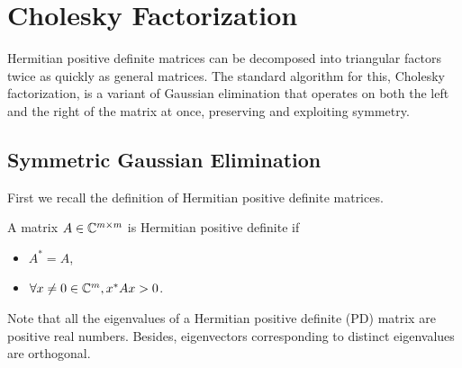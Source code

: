 \chapter{Cholesky Factorization}
Hermitian positive definite matrices can be decomposed into triangular factors twice as quickly as general matrices. The standard algorithm for this, Cholesky factorization, is a variant of Gaussian elimination that operates on both the left and the right of the matrix at once, preserving and exploiting symmetry.

\section{Symmetric Gaussian Elimination}

First we recall the definition of Hermitian positive definite matrices. 

\begin{definition}
\label{def: Hermitian positive definite matrix}
A matrix $A\in \mathbb{C}^{m\times m}$ is Hermitian positive definite if 
\begin{itemize}
    \item $A^*= A$,
    \item $\forall x\neq 0\in \mathbb{C}^m, x^*Ax >0$. 
\end{itemize}
\end{definition}
Note that all the eigenvalues of a Hermitian positive definite (PD) matrix are positive real numbers. Besides, eigenvectors corresponding to distinct eigenvalues are orthogonal. 

